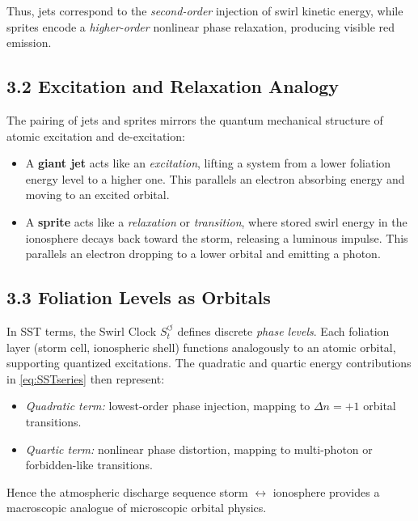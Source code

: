 \documentclass[reprint,aps,onecolumn,nofootinbib]{revtex4-2}
\begin{document}
    Thus, jets correspond to the \emph{second-order} injection of swirl
    kinetic energy, while sprites encode a \emph{higher-order}
    nonlinear phase relaxation, producing visible red emission.

\subsection*{3.2 Excitation and Relaxation Analogy}

    The pairing of jets and sprites mirrors the quantum mechanical
    structure of atomic excitation and de-excitation:

    \begin{itemize}
    \item A \textbf{giant jet} acts like an \emph{excitation}, lifting a system
    from a lower foliation energy level to a higher one.
    This parallels an electron absorbing energy and moving to an
    excited orbital.

    \item A \textbf{sprite} acts like a \emph{relaxation} or \emph{transition},
    where stored swirl energy in the ionosphere decays back toward
    the storm, releasing a luminous impulse.
    This parallels an electron dropping to a lower orbital and
    emitting a photon.
    \end{itemize}

\subsection*{3.3 Foliation Levels as Orbitals}

    In SST terms, the Swirl Clock $S_t^{\boldsymbol{\circlearrowleft}}$
    defines discrete \emph{phase levels}.
    Each foliation layer (storm cell, ionospheric shell) functions
    analogously to an atomic orbital, supporting quantized excitations.
    The quadratic and quartic energy contributions in
    \eqref{eq:SSTseries} then represent:

    \begin{itemize}
    \item \emph{Quadratic term:} lowest-order phase injection,
    mapping to $\Delta n = +1$ orbital transitions.
    \item \emph{Quartic term:} nonlinear phase distortion,
    mapping to multi-photon or forbidden-like transitions.
    \end{itemize}

    Hence the atmospheric discharge sequence storm $\leftrightarrow$ ionosphere
    provides a macroscopic analogue of microscopic orbital physics.
\end{document}
